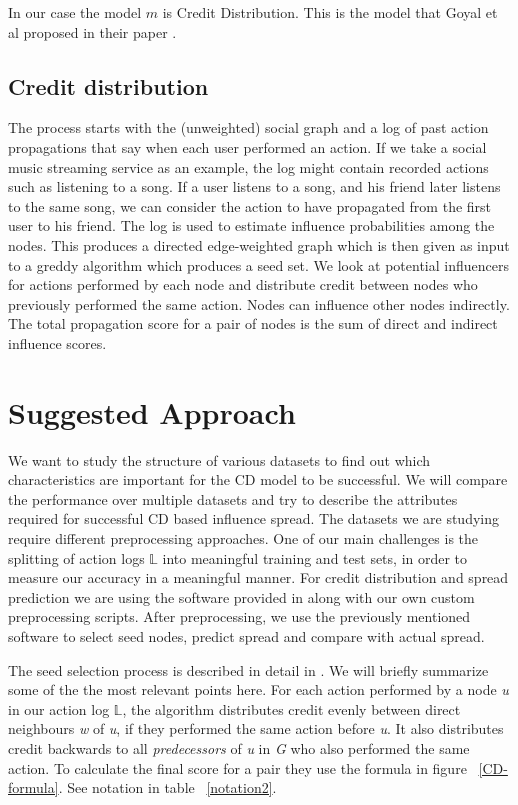 \documentclass{acm_proc_article-sp}
\begin{document}
In our case the model $m$ is Credit Distribution. This is the model that Goyal et al proposed in their paper \cite{goyal:datainfluence}.

\subsection{Credit distribution}

The process starts with the (unweighted) social graph and a log of past action propagations that say when each user performed an action. If we take a social music streaming service as an example, the log might contain recorded actions such as listening to a song. If a user listens to a song, and his friend later listens to the same song, we can consider the action to have propagated from the first user to his friend. The log is used to estimate influence probabilities among the nodes. This produces a directed edge-weighted graph which is then given as input to a greddy algorithm which produces a seed set. We look at potential influencers for actions performed by each node and distribute credit between nodes who previously performed the same action. Nodes can influence other nodes indirectly. The total propagation score for a pair of nodes is the sum of direct and indirect influence scores.

\section{Suggested Approach}

We want to study the structure of various datasets to find out which characteristics are important for the CD model to be successful. We will compare the performance over multiple datasets and try to describe the attributes required for successful CD based influence spread. The datasets we are studying require different preprocessing approaches. One of our main challenges is the splitting of action logs $\mathbb{L}$ into meaningful training and test sets, in order to measure our accuracy in a meaningful manner. For credit distribution and spread prediction we are using the software provided in \cite{goyal:datainfluence} along with our own custom preprocessing scripts. After preprocessing, we use the previously mentioned software to select seed nodes, predict spread and compare with actual spread.

The seed selection process is described in detail in \cite{goyal:datainfluence}. We will briefly summarize some of the the most relevant points here. For each action performed by a node \textit{u} in our action log $\mathbb{L}$, the algorithm distributes credit evenly between direct neighbours \textit{w} of \textit{u}, if they performed the same action before \textit{u}. It also distributes credit backwards to all \textit{predecessors} of \textit{u} in \textit{G} who also performed the same action. To calculate the final score for a pair they use the formula in figure ~\ref{CD-formula}. See notation in table ~\ref{notation2}.
\end{document}
